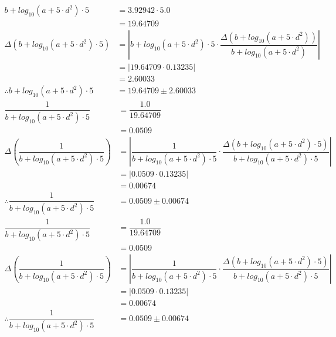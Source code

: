 \documentclass[a4paper]{article}
\begin{document}
\begin{align*}
b + log_{ 10 }\left( a + 5 \cdot d ^ { 2 } \right) \cdot 5 &= 3.92942 \cdot 5.0 \\
&= 19.64709 \\[4mm]
\Delta \left( b + log_{ 10 }\left( a + 5 \cdot d ^ { 2 } \right) \cdot 5 \right) &= \left| b + log_{ 10 }\left( a + 5 \cdot d ^ { 2 } \right) \cdot 5 \cdot \dfrac{ \Delta \left( b + log_{ 10 }\left( a + 5 \cdot d ^ { 2 } \right) \right) }{ b + log_{ 10 }\left( a + 5 \cdot d ^ { 2 } \right) } \right| \\
&= \left| 19.64709 \cdot 0.13235 \right| \\
&= 2.60033\\[4mm]
\therefore b + log_{ 10 }\left( a + 5 \cdot d ^ { 2 } \right) \cdot 5 &= 19.64709 \pm 2.60033
\end{align*}
\begin{align*}
\dfrac{ 1 }{ b + log_{ 10 }\left( a + 5 \cdot d ^ { 2 } \right) \cdot 5 } &= \dfrac{ 1.0 }{ 19.64709 } \\
&= 0.0509 \\[4mm]
\Delta \left( \dfrac{ 1 }{ b + log_{ 10 }\left( a + 5 \cdot d ^ { 2 } \right) \cdot 5 } \right) &= \left| \dfrac{ 1 }{ b + log_{ 10 }\left( a + 5 \cdot d ^ { 2 } \right) \cdot 5 } \cdot \dfrac{ \Delta \left( b + log_{ 10 }\left( a + 5 \cdot d ^ { 2 } \right) \cdot 5 \right) }{ b + log_{ 10 }\left( a + 5 \cdot d ^ { 2 } \right) \cdot 5 } \right| \\
&= \left| 0.0509 \cdot 0.13235 \right| \\
&= 0.00674\\[4mm]
\therefore \dfrac{ 1 }{ b + log_{ 10 }\left( a + 5 \cdot d ^ { 2 } \right) \cdot 5 } &= 0.0509 \pm 0.00674
\end{align*}
\begin{align*}
\dfrac{ 1 }{ b + log_{ 10 }\left( a + 5 \cdot d ^ { 2 } \right) \cdot 5 } &= \dfrac{ 1.0 }{ 19.64709 } \\
&= 0.0509 \\[4mm]
\Delta \left( \dfrac{ 1 }{ b + log_{ 10 }\left( a + 5 \cdot d ^ { 2 } \right) \cdot 5 } \right) &= \left| \dfrac{ 1 }{ b + log_{ 10 }\left( a + 5 \cdot d ^ { 2 } \right) \cdot 5 } \cdot \dfrac{ \Delta \left( b + log_{ 10 }\left( a + 5 \cdot d ^ { 2 } \right) \cdot 5 \right) }{ b + log_{ 10 }\left( a + 5 \cdot d ^ { 2 } \right) \cdot 5 } \right| \\
&= \left| 0.0509 \cdot 0.13235 \right| \\
&= 0.00674\\[4mm]
\therefore \dfrac{ 1 }{ b + log_{ 10 }\left( a + 5 \cdot d ^ { 2 } \right) \cdot 5 } &= 0.0509 \pm 0.00674
\end{align*}
\end{document}
